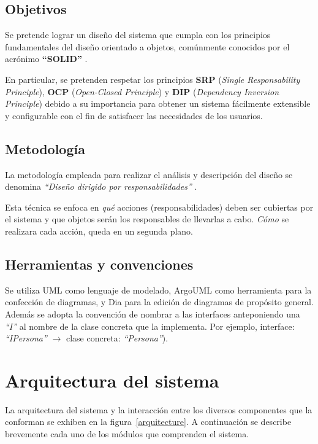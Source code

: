 \documentclass[12pt,a4paper,spanish]{article}
\begin{document}
\subsection{Objetivos}
Se pretende lograr un diseño del sistema que cumpla con los principios
fundamentales del diseño orientado a objetos, comúnmente conocidos por el
acrónimo \textbf{``SOLID''} \cite{martin}.

En particular, se pretenden respetar los principios \textbf{SRP}
(\textit{Single Responsability Principle}), \textbf{OCP} (\textit{Open-Closed
Principle}) y \textbf{DIP} (\textit{Dependency Inversion Principle})
debido a su importancia para obtener un sistema f\'acilmente extensible
y configurable con el fin de satisfacer las necesidades de los usuarios.
  
\subsection{Metodología}
La metodología empleada para realizar el análisis y descripción del
diseño se denomina \emph{``Diseño dirigido por responsabilidades''}
\cite{rebecca}. 

Esta técnica se enfoca en \textit{qué} acciones
(responsabilidades) deben ser cubiertas por el sistema 
y que objetos serán los responsables de llevarlas a cabo.
\textit{Cómo} se realizara cada acción, queda en un segunda plano.

\subsection{Herramientas y convenciones}
Se utiliza UML\cite{uml} como lenguaje de modelado, ArgoUML\cite{argoUML}
como herramienta para la confección de diagramas, y Dia\cite{dia} para la edición
de diagramas de propósito general. Además se adopta la convención de nombrar a
 las interfaces anteponiendo una \textit{``I''} al nombre de la clase concreta
que la implementa. Por ejemplo, interface: \textit{``IPersona''} $\to$
clase concreta: \textit{``Persona''}).

\section{Arquitectura del sistema}
\label{arquitectura}
La arquitectura del sistema y la interacción entre los diversos componentes que la conforman se exhiben en la figura~\ref{arquitecture}.	A continuación se describe brevemente cada uno de los módulos que comprenden el sistema.
\end{document}
